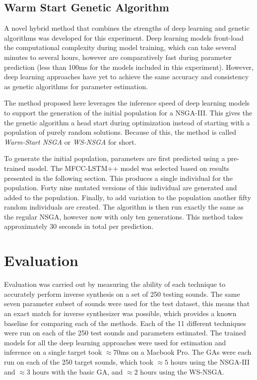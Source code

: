 \subsection{Warm Start Genetic Algorithm}
A novel hybrid method that combines the strengths of deep learning and genetic algorithms was developed for this experiment. Deep learning models front-load the computational complexity during model training, which can take several minutes to several hours, however are comparatively fast during parameter prediction (less than 100ms for the models included in this experiment). However, deep learning approaches have yet to achieve the same accuracy and consistency as genetic algorithms for parameter estimation.

The method proposed here leverages the inference speed of deep learning models to support the generation of the initial population for a NSGA-III. This gives the the genetic algorithm a head start during optimization instead of starting with a population of purely random solutions. Because of this, the method is called \textit{Warm-Start NSGA} or \textit{WS-NSGA} for short.

To generate the initial population, parameters are first predicted using a pre-trained model. The MFCC-LSTM++ model was selected based on results presented in the following section. This produces a single individual for the population. Forty nine mutated versions of this individual are generated and added to the population. Finally, to add variation to the population another fifty random individuals are created. The algorithm is then run exactly the same as the regular NSGA, however now with only ten generations. This method takes approximately 30 seconds in total per prediction.

\section{Evaluation}
\label{sec:inverse-synth-eval}

Evaluation was carried out by measuring the ability of each technique to accurately perform inverse synthesis on a set of 250 testing sounds. The same seven parameter subset of sounds were used for the test dataset, this means that an exact match for inverse synthesizer was possible, which provides a known baseline for comparing each of the methods. Each of the 11 different techniques were run on each of the 250 test sounds and parameters estimated. The trained models for all the deep learning approaches were used for estimation and inference on a single target took $\approx 70$ms on a Macbook Pro. The GAs were each run on each of the 250 target sounds, which took $\approx 5$ hours using the NSGA-III and $\approx 3$ hours with the basic GA, and $\approx 2$ hours using the WS-NSGA. 

